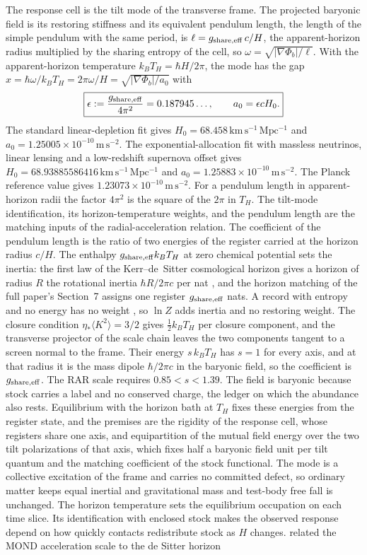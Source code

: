 \documentclass[11pt]{article}
\begin{document}
The response cell is the tilt mode of the transverse frame. The projected baryonic field is its restoring stiffness and its equivalent pendulum length, the length of the simple pendulum with the same period, is $\ell=g_{\rm share,eff}\,c/H$, the apparent-horizon radius multiplied by the sharing entropy of the cell, so $\omega=\sqrt{|\nabla\Phi_b|/\ell}$. With the apparent-horizon temperature $k_BT_H=\hbar H/2\pi$, the mode has the gap $x=\hbar\omega/k_BT_H=2\pi\omega/H=\sqrt{|\nabla\Phi_b|/a_0}$ with
\[
\boxed{
\epsilon:=\frac{g_{\rm share,eff}}{4\pi^2}=0.187945\ldots,
\qquad
a_0=\epsilon cH_0.
}
\]
The standard linear-depletion fit gives $H_0=68.458\,\mathrm{km\,s^{-1}\,Mpc^{-1}}$ and $a_0=1.25005\times10^{-10}\,\mathrm{m\,s^{-2}}$. The exponential-allocation fit with massless neutrinos, linear lensing and a low-redshift supernova offset gives $H_0=68.93885586416\,\mathrm{km\,s^{-1}\,Mpc^{-1}}$ and $a_0=1.25883\times10^{-10}\,\mathrm{m\,s^{-2}}$. The Planck reference value gives $1.23073\times10^{-10}\,\mathrm{m\,s^{-2}}$. For a pendulum length in apparent-horizon radii the factor $4\pi^2$ is the square of the $2\pi$ in $T_H$. The tilt-mode identification, its horizon-temperature weights, and the pendulum length are the matching inputs of the radial-acceleration relation. The coefficient of the pendulum length is the ratio of two energies of the register carried at the horizon radius $c/H$. The enthalpy $g_{\rm share,eff}k_BT_H$ at zero chemical potential sets the inertia: the first law of the Kerr--de~Sitter cosmological horizon gives a horizon of radius $R$ the rotational inertia $\hbar R/2\pi c$ per nat \citep{GibbonsHawking1977b,GibbonsPerryPope2005}, and the horizon matching of the full paper's Section~7 assigns one register $g_{\rm share,eff}$ nats. A record with entropy and no energy has no weight \citep{Tolman1930}, so $\ln Z$ adds inertia and no restoring weight. The closure condition $\eta_*\langle K^2\rangle=3/2$ gives $\tfrac12k_BT_H$ per closure component, and the transverse projector of the scale chain leaves the two components tangent to a screen normal to the frame. Their energy $s\,k_BT_H$ has $s=1$ for every axis, and at that radius it is the mass dipole $\hbar/2\pi c$ in the baryonic field, so the coefficient is $g_{\rm share,eff}$. The RAR scale requires $0.85<s<1.39$. The field is baryonic because stock carries a label and no conserved charge, the ledger on which the abundance also rests. Equilibrium with the horizon bath at $T_H$ \citep{BorchersBuchholz1999} fixes these energies from the register state, and the premises are the rigidity of the response cell, whose registers share one axis, and equipartition of the mutual field energy over the two tilt polarizations of that axis, which fixes half a baryonic field unit per tilt quantum and the matching coefficient of the stock functional. The mode is a collective excitation of the frame and carries no committed defect, so ordinary matter keeps equal inertial and gravitational mass and test-body free fall is unchanged. The horizon temperature sets the equilibrium occupation on each time slice. Its identification with enclosed stock makes the observed response depend on how quickly contacts redistribute stock as $H$ changes. \citet{Milgrom1999} related the MOND acceleration scale to the de Sitter horizon 
\end{document}
